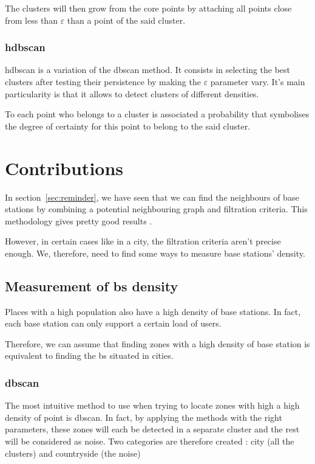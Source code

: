 \documentclass[lettersize,journal,english]{IEEEtran}
\begin{document}
            The clusters will then \og grow\fg{} from the core points by attaching all points close from less than \emph{$\varepsilon$} than a point of the said cluster.

        \subsubsection{\acrshort{hdbscan}}
            \acrshort{hdbscan} \cite{10.1007/978-3-642-37456-2_14} is a variation of the \acrshort{dbscan} method.
            It consists in selecting the best clusters after testing their persistence by making the $\varepsilon$ parameter vary. It's main particularity is that it allows to detect clusters of different densities.

            To each point who belongs to a cluster is associated a probability that symbolises the degree of certainty for this point to belong to the said cluster.

\section{Contributions\label{sec:contrib}}
    \noindent In section~\ref{sec:reminder}, we have seen that we can find the neighbours of base stations by combining a potential neighbouring graph and filtration criteria. This methodology gives pretty good results \cite{art_del_paq}.

    However, in certain cases like in a city, the filtration criteria aren't precise enough. We, therefore, need to find some ways to measure base stations' density.

    \subsection{Measurement of \acrshort{bs} density}
        Places with a high population also have a high density of base stations. In fact, each base station can only support a certain load of users.

        Therefore, we can assume that finding zones with a high density of base station is equivalent to finding the \acrshort{bs} situated in \og cities\fg{}.

        \subsubsection{\acrshort{dbscan}}
            The most intuitive method to use when trying to locate zones with high a high density of point is \acrshort{dbscan}. In fact, by applying the methods with the right parameters, these zones will each be detected in a separate cluster and the rest will be considered as noise. Two categories are therefore created : city (all the clusters) and countryside (the noise)
\end{document}
